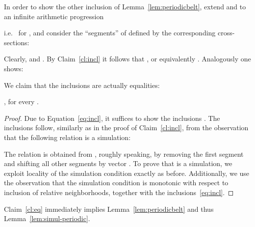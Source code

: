 In order to show the other inclusion of Lemma~\ref{lem:periodicbelt}, extend  and  to an infinite arithmetic progression

i.e.~ for ,
and consider the ``segments''  of  defined by the corresponding cross-sections:

Clearly,  and 
.
By Claim~\ref{cl:incl} it follows that , or equivalently
. Analogously one shows:

We claim that the inclusions are actually equalities:

\begin{claim} \label{cl:eq}
, for every .
\end{claim}
\begin{proof}
Due to Equation~\eqref{eq:incl}, it suffices to show the inclusions .
The inclusions follow, similarly as in the proof of Claim~\ref{cl:incl}, from the observation that the following relation
is a simulation:

The relation  is obtained from , roughly speaking, by removing the first segment  and shifting all other segments
 by vector . To prove that  is a simulation, we exploit locality of the simulation condition 
exactly as before.
Additionally, we use the observation that the simulation condition is monotonic with respect to inclusion of relative neighborhoods,
together with the inclusions~\eqref{eq:incl}.
\end{proof}

\noindent
Claim~\ref{cl:eq} immediately implies Lemma~\ref{lem:periodicbelt}
and thus Lemma~\ref{lem:simul-periodic}.

























